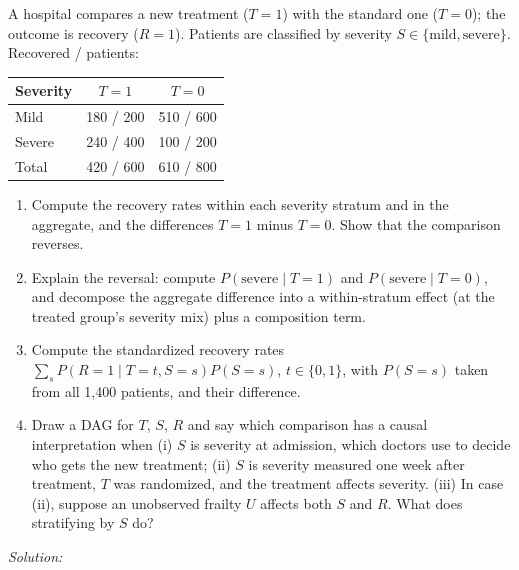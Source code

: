 \documentclass[11pt,a4paper]{article}
\newif\ifsolucoes
\newcommand{\espacoresol}{4.5cm}   %
\newcommand{\resolespaco}{\ifsolucoes\else\par\textit{Solution:}\vspace{\espacoresol}\par\fi}
\begin{document}
\noindent A hospital compares a new treatment ($T=1$) with the standard one ($T=0$); the outcome is recovery
($R=1$). Patients are classified by severity $S\in\{\text{mild},\text{severe}\}$. Recovered / patients:
\begin{center}\small
\begin{tabular}{lcc}
\toprule
Severity & $T=1$ & $T=0$\\
\midrule
Mild & 180 / 200 & 510 / 600\\
Severe & 240 / 400 & 100 / 200\\
\midrule
Total & 420 / 600 & 610 / 800\\
\bottomrule
\end{tabular}
\end{center}
\begin{enumerate}[label=(\alph*)]
\item Compute the recovery rates within each severity stratum and in the aggregate, and the differences
$T=1$ minus $T=0$. Show that the comparison reverses.
\item Explain the reversal: compute $P(\text{severe}\mid T=1)$ and $P(\text{severe}\mid T=0)$, and decompose
the aggregate difference into a within-stratum effect (at the treated group's severity mix) plus a
composition term.
\item Compute the standardized recovery rates $\sum_sP(R=1\mid T=t,S=s)P(S=s)$, $t\in\{0,1\}$, with $P(S=s)$
taken from all 1,400 patients, and their difference.
\item Draw a DAG for $T$, $S$, $R$ and say which comparison has a causal interpretation when
(i) $S$ is severity at admission, which doctors use to decide who gets the new treatment;
(ii) $S$ is severity measured one week after treatment, $T$ was randomized, and the treatment affects severity.
(iii) In case (ii), suppose an unobserved frailty $U$ affects both $S$ and $R$. What does stratifying by $S$ do?
\end{enumerate}
\resolespaco
\end{document}
